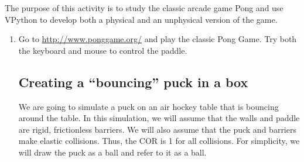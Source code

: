 
\apparatus
{}

\longgoal

The purpose of this activity is to study the classic arcade game Pong and use VPython to develop both a physical and an unphysical version of the game.

\procedure

\begin{enumerate}

\subsection*{Playing Pong}

\item Go to \url{http://www.ponggame.org/} and play the classic Pong Game. Try both the keyboard and mouse to control the paddle.


\subsection*{Creating a ``bouncing'' puck in a box}

We are going to simulate a puck on an air hockey table that is bouncing around the table. In this simulation, we will assume that the walls and paddle are rigid, frictionless barriers. We will also assume that the puck and barriers make elastic collisions. Thus, the COR is 1 for all collisions. For simplicity, we will draw the puck as a ball and refer to it as a ball.


\end{enumerate}
